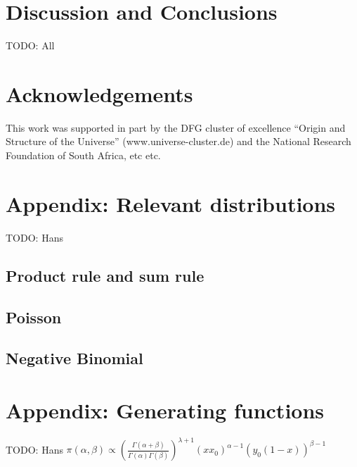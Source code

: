 \documentclass[11pt]{article}
\begin{document}
\section{Discussion and Conclusions}

TODO: All

\section*{Acknowledgements}

This work was supported in part by the DFG cluster of excellence
``Origin and Structure of the Universe'' (www.universe-cluster.de) and
the National Research Foundation of South Africa, etc etc.

\section{Appendix: Relevant distributions}

TODO: Hans

\subsection{Product rule and sum rule}

\subsection{Poisson}

\subsection{Negative Binomial}

\section{Appendix: Generating functions}

TODO: Hans
$\pi(\alpha, \beta) \propto \left( \frac{\Gamma(\alpha+\beta)}{\Gamma(\alpha) \Gamma(\beta)} \right)^{\lambda +1} (x x_0)^{\alpha-1} \left(y_0 (1-x) \right)^{\beta-1}$






\end{document}
